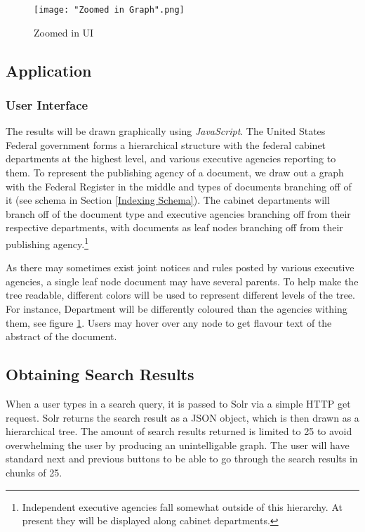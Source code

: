 \documentclass{sig-alternate-05-2015}
\begin{document}
\begin{figure} \label{Interface}
\centering
	\texttt{[image: "Zoomed in Graph".png]}
\caption{Zoomed in UI}
\end{figure}

\subsection{Application}

\subsubsection{User Interface}
The results will be drawn graphically using \emph{JavaScript}. The United States Federal government forms a hierarchical structure with the federal cabinet departments at the highest level, and various executive agencies reporting to them. To represent the publishing agency of a document, we draw out a graph with the Federal Register in the middle and types of documents branching off of it (see schema in Section \ref{Indexing Schema}). The cabinet departments will branch off of the document type and executive agencies branching off from their respective departments, with documents as leaf nodes branching off from their publishing agency.\footnote{Independent executive agencies fall somewhat outside of this hierarchy. At present they will be displayed along cabinet departments.}

As there may sometimes exist joint notices and rules posted by various executive agencies, a single leaf node document may have several parents. To help make the tree readable, different colors will be used to represent different levels of the tree. For instance, Department will be differently coloured than the agencies withing them, see figure \ref{Interface}. Users may hover over any node to get flavour text of the abstract of the document. 

\subsection{Obtaining Search Results}
When a user types in a search query, it is passed to Solr via a simple HTTP get request. Solr returns the search result as a JSON object, which is then drawn as a hierarchical tree. The amount of search results returned is limited to 25 to avoid overwhelming the user by producing an unintelligable graph. The user will have standard next and previous buttons to be able to go through the search results in chunks of 25. 
\end{document}
